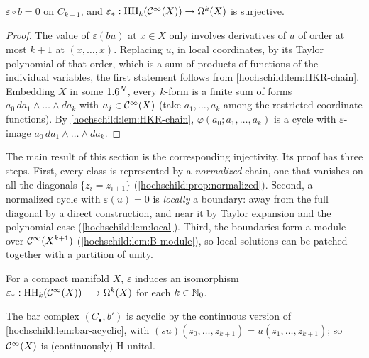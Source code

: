 \begin{lemma}\label{hochschild:lem:HKR-smooth}
$\varepsilon\circ b=0$ on $C_{k+1}$, and $\varepsilon_*:\operatorname{HH}_k(\mathcal{C}^\infty(X))\to
\Omega^k(X)$ is surjective.
\end{lemma}
\begin{proof}
The value of $\varepsilon(bu)$ at $x\in X$ only involves derivatives of $u$
of order at most $k+1$ at $(x,\dots,x)$. Replacing $u$, in local coordinates,
by its Taylor polynomial of that order, which is a sum of products of
functions of the individual variables, the first statement follows from
\cref{hochschild:lem:HKR-chain}. Embedding $X$ in some $1.6^N$, every
$k$-form is a finite sum of forms $a_0\,da_1\wedge\dots\wedge da_k$ with
$a_j\in\mathcal{C}^\infty(X)$ (take $a_1,\dots,a_k$ among the restricted coordinate
functions). By \cref{hochschild:lem:HKR-chain},
$\varphi(a_0;a_1,\dots,a_k)$ is a cycle with $\varepsilon$-image
$a_0\,da_1\wedge\dots\wedge da_k$.
\end{proof}

The main result of this section is the corresponding injectivity. Its proof
has three steps. First, every class is represented by a \emph{normalized}
chain, one that vanishes on all the diagonals $\{z_i=z_{i+1}\}$
(\cref{hochschild:prop:normalized}). Second, a normalized cycle with
$\varepsilon(u)=0$ is \emph{locally} a boundary: away from the full diagonal
by a direct construction, and near it by Taylor expansion and the polynomial
case (\cref{hochschild:lem:local}). Third, the boundaries form a module over
$\mathcal{C}^\infty(X^{k+1})$ (\cref{hochschild:lem:B-module}), so local solutions can be
patched together with a partition of unity.

\begin{theorem}[Connes]\label{hochschild:thm:Connes}
For a compact manifold $X$, $\varepsilon$ induces an isomorphism
$\varepsilon_*:\operatorname{HH}_k(\mathcal{C}^\infty(X))\longrightarrow\Omega^k(X)$ for each $k\in\mathbb{N}_0$.
\end{theorem}

The bar complex $(C_\bullet,b')$ is acyclic by the continuous version of
\cref{hochschild:lem:bar-acyclic}, with $(su)(z_0,\dots,z_{k+1})=u(z_1,\dots,z_{k+1})$;
so $\mathcal{C}^\infty(X)$ is (continuously) H-unital.

